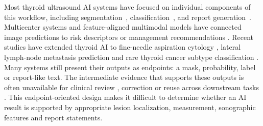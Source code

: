 \documentclass[fleqn,10pt]{wlscirep}
\begin{document}
Most thyroid ultrasound AI systems have focused on individual components of this workflow, including segmentation~\cite{gong2021multi,gong2023thyroid,sun2025clip}, classification~\cite{gong2022less,Peng2021LancetDigitalHealthThyNet,Chen2022RadiologyTIRADS,Yao2025NPJDigitMedThyGPT}, and report generation~\cite{li_ultrasound_2024,Tanno2025ClinicianVLM,li_towards_2025}. Multicenter systems \cite{Peng2021LancetDigitalHealthThyNet,Wang2024LancetDigitalHealthFNAB} and feature-aligned multimodal models \cite{Chen2022RadiologyTIRADS,Yao2025NPJDigitMedThyGPT,Tanno2025ClinicianVLM} have connected image predictions to risk descriptors \cite{Chen2022RadiologyTIRADS,Yao2025NPJDigitMedThyGPT} or management recommendations \cite{Peng2021LancetDigitalHealthThyNet,Yao2025NPJDigitMedThyGPT}. Recent studies have extended thyroid AI to fine-needle aspiration cytology \cite{Wang2024LancetDigitalHealthFNAB}, lateral lymph-node metastasis prediction \cite{Shen2025NatCommunLLNM} and rare thyroid cancer subtype classification \cite{Dai2025NatCommunThyroidSubtype}. Many systems still present their outputs as endpoints: a mask, probability, label or report-like text. The intermediate evidence that supports these outputs is often unavailable for clinical review \cite{Chen2022HumanCenteredXAI,Wekenborg2025RealWorldHAI}, correction \cite{Wekenborg2025RealWorldHAI,Giddings2024ClinicianPatientInteraction} or reuse across downstream tasks \cite{Chen2022HumanCenteredXAI,Tikhomirov2024LostCognitive,you2026learning}. This endpoint-oriented design makes it difficult to determine whether an AI result is supported by appropriate lesion localization, measurement, sonographic features and report statements.
\end{document}
